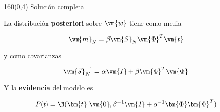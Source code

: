 \documentclass[shownotes,aspectratio=169]{beamer}
\begin{document}
\begin{frame}[plain]
\begin{textblock}{160}(0,4)
 \Large \centering Soluci\'on completa
\end{textblock}
 \vspace{0.75cm}

La distribuci\'on \textbf{posteriori} sobre $\vm{w}$ tiene como media

\begin{equation}
 \vm{m}_N = \beta  \vm{S}_N\vm{\Phi}^T \vm{t}
\end{equation}

y como covarianzas

\begin{equation}
 \vm{S}_N^{-1} = \alpha \vm{I} + \beta \vm{\Phi}^T\vm{\Phi}
\end{equation}

\pause

Y la \textbf{evidencia} del modelo es

\begin{equation}
 P(t) = \N(\bm{t}| \vm{0}, \beta^{-1} \vm{I} + \alpha^{-1}\bm{\Phi}\bm{\Phi}^T  )
\end{equation}

\vspace{0.75cm}

\small
{}

\end{frame}
\end{document}
